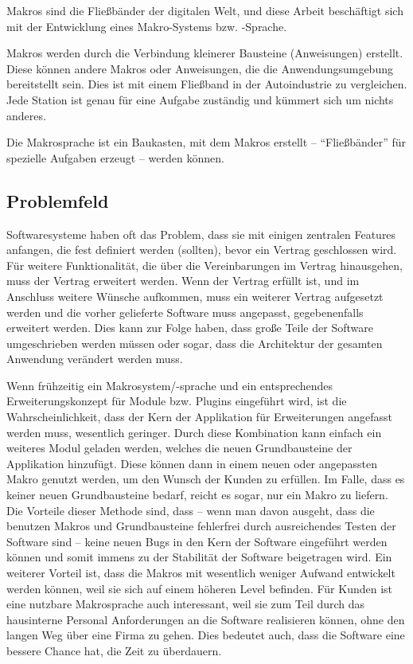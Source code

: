   Makros sind die Fließbänder der digitalen Welt, und diese Arbeit beschäftigt sich mit der Entwicklung eines Makro-Systems bzw. -Sprache.

  Makros werden durch die Verbindung kleinerer Bausteine (Anweisungen) erstellt. Diese können andere Makros oder Anweisungen, die die Anwendungsumgebung bereitstellt sein. Dies ist mit einem Fließband in der Autoindustrie zu vergleichen. Jede Station ist genau für eine Aufgabe zuständig und kümmert sich um nichts anderes.

  Die Makrosprache ist ein Baukasten, mit dem Makros erstellt -- ``Fließbänder'' für spezielle Aufgaben erzeugt -- werden können.

  \subsection{Problemfeld}
  \label{ssec:Problemfeld}
    Softwaresysteme haben oft das Problem, dass sie mit einigen zentralen Features anfangen, die fest definiert werden (sollten), bevor ein Vertrag geschlossen wird. Für weitere Funktionalität, die über die Vereinbarungen im Vertrag hinausgehen, muss der Vertrag erweitert werden. Wenn der Vertrag erfüllt ist, und im Anschluss weitere Wünsche aufkommen, muss ein weiterer Vertrag aufgesetzt werden und die vorher gelieferte Software muss angepasst, gegebenenfalls erweitert werden. Dies kann zur Folge haben, dass große Teile der Software umgeschrieben werden müssen oder sogar, dass die Architektur der gesamten Anwendung verändert werden muss.

    Wenn frühzeitig ein Makrosystem/-sprache und ein entsprechendes Erweiterungskonzept für Module bzw. Plugins eingeführt wird, ist die Wahrscheinlichkeit, dass der Kern der Applikation für Erweiterungen angefasst werden muss, wesentlich geringer. Durch diese Kombination kann einfach ein weiteres Modul geladen werden, welches die neuen Grundbausteine der Applikation hinzufügt. Diese können dann in einem neuen oder angepassten Makro genutzt werden, um den Wunsch der Kunden zu erfüllen. Im Falle, dass es keiner neuen Grundbausteine bedarf, reicht es sogar, nur ein Makro zu liefern. Die Vorteile dieser Methode sind, dass -- wenn man davon ausgeht, dass die benutzen Makros und Grundbausteine fehlerfrei durch ausreichendes Testen der Software sind -- keine neuen Bugs in den Kern der Software eingeführt werden können und somit immens zu der Stabilität der Software beigetragen wird. Ein weiterer Vorteil ist, dass die Makros mit wesentlich weniger Aufwand entwickelt werden können, weil sie sich auf einem höheren Level befinden. Für Kunden ist eine nutzbare Makrosprache auch interessant, weil sie zum Teil durch das hausinterne Personal Anforderungen an die Software realisieren können, ohne den langen Weg über eine Firma zu gehen. Dies bedeutet auch, dass die Software eine bessere Chance hat, die Zeit zu überdauern.


